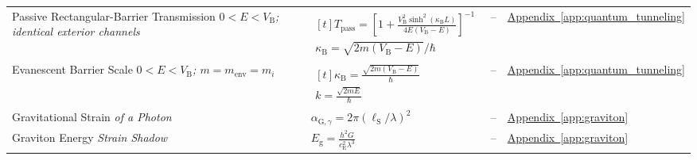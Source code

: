 \begin{longtable}{@{} p{4.5cm} p{6cm} c p{4cm} @{}}
{\raggedright Passive Rectangular-Barrier Transmission \newline \textit{$0<E<V_{\mathrm B}$; identical exterior channels}\par} & {\raggedright $\begin{gathered}[t]T_{\mathrm{pass}}=\left[1+\frac{V_{\mathrm B}^2\sinh^2(\kappa_{\mathrm B}L)}{4E(V_{\mathrm B}-E)}\right]^{-1} \\ \kappa_{\mathrm B}=\sqrt{2m(V_{\mathrm B}-E)}/\hbar\end{gathered}$\par} & -- & {\raggedright \hyperref[app:quantum_tunneling]{Appendix~\ref*{app:quantum_tunneling}}\par} \\

{\raggedright Evanescent Barrier Scale \newline \textit{$0<E<V_{\mathrm B}$; $m=m_{\mathrm{env}}=m_i$}\par} & {\raggedright $\begin{gathered}[t]\kappa_{\mathrm B}=\frac{\sqrt{2m(V_{\mathrm B}-E)}}{\hbar} \\ k=\frac{\sqrt{2mE}}\hbar\end{gathered}$\par} & -- & {\raggedright \hyperref[app:quantum_tunneling]{Appendix~\ref*{app:quantum_tunneling}}\par} \\

{\raggedright Gravitational Strain \newline \textit{of a Photon}\par} & {\raggedright $\alpha_{\mathrm{G},\gamma}=2\pi(\ell_{\mathrm S}/\lambda)^2$\par} & -- & {\raggedright \hyperref[app:graviton]{Appendix~\ref*{app:graviton}}\par} \\

{\raggedright Graviton Energy \newline \textit{Strain Shadow}\par} & {\raggedright $E_{\mathrm{g}} = \frac{h^2 G}{c_{\mathrm{E}}^2 \lambda^3}$\par} & -- & {\raggedright \hyperref[app:graviton]{Appendix~\ref*{app:graviton}}\par} \\


\end{longtable}

